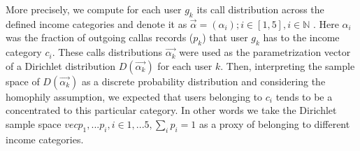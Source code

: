 More precisely, we compute for each user $g_k$ its call distribution across the defined income categories and denote it as $\vec{\alpha} =(\alpha_i); i \in [1,5], i\in \mathbb{N}$ . Here $\alpha_i$ was the fraction of outgoing callas records ($p_k$) that user $g_k$ has to the income category $c_i$. These calls distributions $\vec{\alpha_k}$ were used as the parametrization vector of a Dirichlet distribution $D(\vec{\alpha_k})$ for each user $k$. Then, interpreting the sample space of $D(\vec{\alpha_k})$ as a discrete probability distribution and considering the homophily assumption,  we expected that users belonging to $c_i$ tends to be a concentrated to this particular category. In other words we take the Dirichlet sample space $vec{p_1,...p_i}, i\in 1,...5, \sum_i{p_i}=1$ as a proxy of belonging to different income categories.\\

